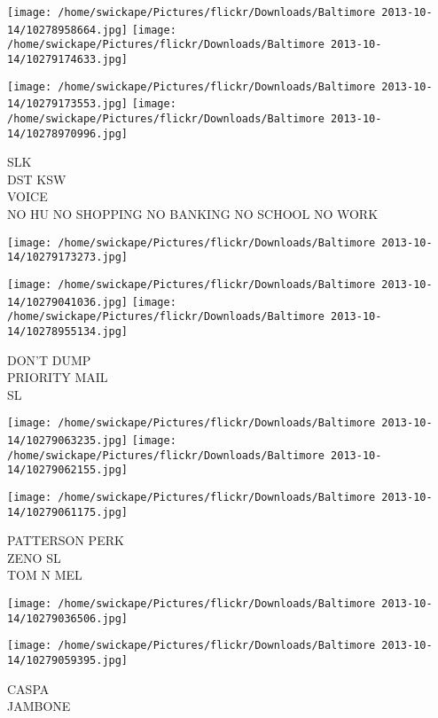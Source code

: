 \documentclass[10pt,letterpaper]{article}
\begin{document}
\texttt{[image: /home/swickape/Pictures/flickr/Downloads/Baltimore 2013-10-14/10278958664.jpg]}
\texttt{[image: /home/swickape/Pictures/flickr/Downloads/Baltimore 2013-10-14/10279174633.jpg]}

\texttt{[image: /home/swickape/Pictures/flickr/Downloads/Baltimore 2013-10-14/10279173553.jpg]}
\texttt{[image: /home/swickape/Pictures/flickr/Downloads/Baltimore 2013-10-14/10278970996.jpg]}

SLK\\
DST KSW\\
VOICE\\
NO HU NO SHOPPING NO BANKING NO SCHOOL NO WORK\\
\pagebreak

\texttt{[image: /home/swickape/Pictures/flickr/Downloads/Baltimore 2013-10-14/10279173273.jpg]}

\vspace{0.25in}
\texttt{[image: /home/swickape/Pictures/flickr/Downloads/Baltimore 2013-10-14/10279041036.jpg]}
\texttt{[image: /home/swickape/Pictures/flickr/Downloads/Baltimore 2013-10-14/10278955134.jpg]}

DON'T DUMP\\
PRIORITY MAIL\\
SL\\
\pagebreak

\texttt{[image: /home/swickape/Pictures/flickr/Downloads/Baltimore 2013-10-14/10279063235.jpg]}
\texttt{[image: /home/swickape/Pictures/flickr/Downloads/Baltimore 2013-10-14/10279062155.jpg]}

\vspace{0.25in}
\texttt{[image: /home/swickape/Pictures/flickr/Downloads/Baltimore 2013-10-14/10279061175.jpg]}

PATTERSON PERK\\
ZENO SL\\
TOM N MEL\\
\pagebreak

\texttt{[image: /home/swickape/Pictures/flickr/Downloads/Baltimore 2013-10-14/10279036506.jpg]}

\vspace{0.25in}
\texttt{[image: /home/swickape/Pictures/flickr/Downloads/Baltimore 2013-10-14/10279059395.jpg]}

CASPA\\
JAMBONE\\
\pagebreak
\end{document}

